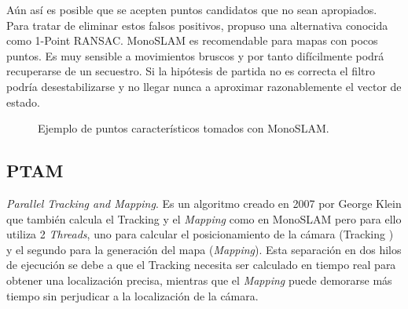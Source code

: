 Aún así es posible que se acepten puntos candidatos que no sean apropiados. Para tratar de eliminar estos falsos positivos, \cite{civera20101} propuso una alternativa conocida como 1-Point RANSAC.
MonoSLAM es recomendable para mapas con pocos puntos. Es muy sensible a movimientos bruscos y por tanto difícilmente podrá recuperarse de un secuestro. Si la hipótesis de partida no es correcta el filtro podría desestabilizarse y no llegar nunca a aproximar razonablemente el vector de estado.


\begin{figure}[H]
\begin{center}
\end{center}
\caption{Ejemplo de puntos característicos tomados con MonoSLAM.}
\end{figure}
\clearpage


\subsection{PTAM}
\textit{Parallel Tracking and \textit{Mapping}}. Es un algoritmo creado en 2007 por George Klein \cite{Klein2007parallel} que también calcula el Tracking y el \textit{Mapping} como en MonoSLAM pero para ello utiliza 2 \textit{Threads}, uno para calcular el posicionamiento de la cámara (Tracking ) y el segundo para la generación del mapa (\textit{Mapping}). Esta separación en dos hilos de ejecución se debe a que el Tracking necesita ser calculado en tiempo real para obtener una localización precisa, mientras que el \textit{Mapping} puede demorarse más tiempo sin perjudicar a la localización de la cámara. 

